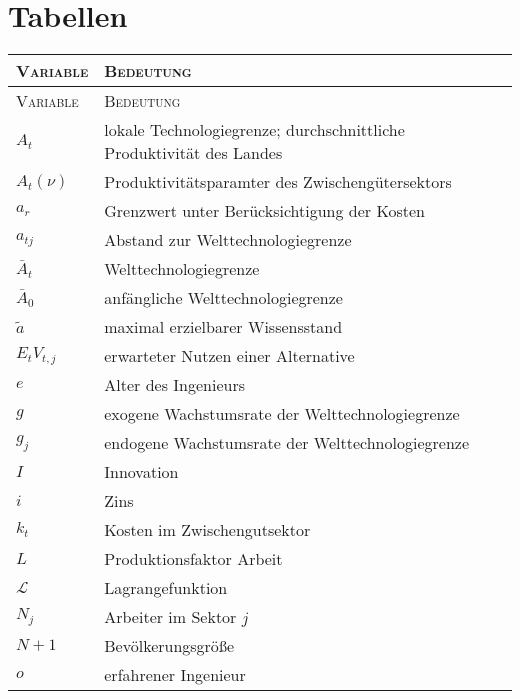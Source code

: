 
\chapter{Tabellen}

\begin{longtable}{|l|l|} %
	\hline
	\textsc{Variable} & \textsc{Bedeutung}\\
	\hline
	\endfirsthead
	
	\hline
	\textsc{Variable} & \textsc{Bedeutung}\\
	\hline
	\endhead
	
	\hline
	\endfoot
	
	\hline
	\endlastfoot
		
	
		${A}_{t} $ & lokale Technologiegrenze; durchschnittliche Produktivität des Landes\\
		$A_{t}(\nu)$ & Produktivitätsparamter des Zwischeng\"utersektors\\
		$a_{r}$ & Grenzwert unter Berücksichtigung der Kosten\\
		$a_{tj}$ & Abstand zur Welttechnologiegrenze\\%
		$\bar{A}_{t} $ & Welttechnologiegrenze\\
		$\bar{A}_{0}$ & anf\"angliche Welttechnologiegrenze\\
		$\tilde{a}$ & maximal erzielbarer Wissensstand \\
		$E_{t}V_{t,j}$ & erwarteter Nutzen einer Alternative\\
		$e$ & Alter des Ingenieurs\\
		$g$ & exogene Wachstumsrate der Welttechnologiegrenze\\
		$g_{j}$ & endogene Wachstumsrate der Welttechnologiegrenze\\
		$I$ & Innovation\\
		$i$& Zins\\
		$k_t$ & Kosten im Zwischengutsektor\\
		$L$ & Produktionsfaktor Arbeit\\
		$\mathcal{L}$ & Lagrangefunktion\\
		$N_{j}$ & Arbeiter im Sektor $j$\\
		$N+1$ & Bev\"olkerungsgrö{\ss}e\\
		$o$ & erfahrener Ingenieur\\

\end{longtable}
